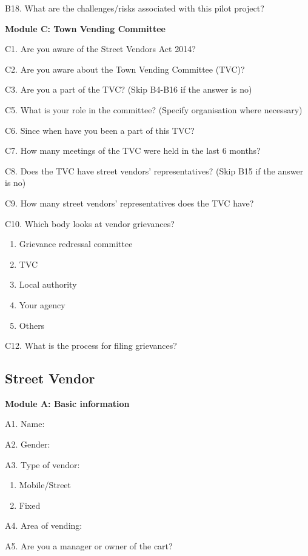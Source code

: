 \documentclass[a4paper, 12pt, twoside]{article}
\begin{document}
{{\begin{mdframed}[backgroundcolor=gray!20]
B18. What are the challenges/risks associated with this pilot project?

\textbf{Module C: Town Vending Committee}

C1. Are you aware of the Street Vendors Act 2014?

C2. Are you aware about the Town Vending Committee (TVC)?

C3. Are you a part of the TVC? (Skip B4-B16 if the answer is no)

C5. What is your role in the committee? (Specify organisation where necessary)

C6. Since when have you been a part of this TVC?

C7. How many meetings of the TVC were held in the last 6 months?

C8. Does the TVC have street vendors’ representatives? (Skip B15 if the answer is no)

C9. How many street vendors’ representatives does the TVC have?

C10. Which body looks at vendor grievances?
\begin{enumerate}[nosep]
\item Grievance redressal committee
\item TVC
\item Local authority
\item Your agency
\item Others
\end{enumerate}

C12. What is the process for filing grievances?
\end{mdframed}

\begin{mdframed}[backgroundcolor=gray!20]
\subsection*{Street Vendor}

\textbf{Module A: Basic information}

A1. Name:

A2. Gender:

A3. Type of vendor:
\begin{enumerate}[nosep]
\item Mobile/Street
\item Fixed
\end{enumerate}

A4. Area of vending:

A5. Are you a manager or owner of the cart?


\end{mdframed}}}
\end{document}
